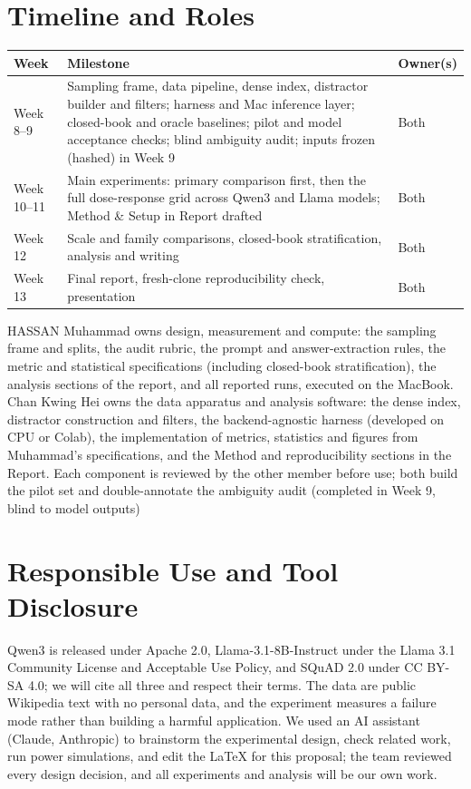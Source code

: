 \documentclass[11pt]{article}
\begin{document}
\section{Timeline and Roles}
\begin{tabularx}{\linewidth}{@{}l X l@{}}
\toprule
\textbf{Week} & \textbf{Milestone} & \textbf{Owner(s)} \\
\midrule
Week 8--9 & Sampling frame, data pipeline, dense index, distractor builder and filters; harness and Mac inference layer; closed-book and oracle baselines; pilot and model acceptance checks; blind ambiguity audit; inputs frozen (hashed) in Week 9 & Both \\
Week 10--11 & Main experiments: primary comparison first, then the full dose-response grid across Qwen3 and Llama models; Method \& Setup in Report drafted & Both \\
Week 12 & Scale and family comparisons, closed-book stratification, analysis and writing & Both \\
Week 13 & Final report, fresh-clone reproducibility check, presentation & Both \\
\bottomrule
\end{tabularx}

\vspace{0.4em}
HASSAN Muhammad owns design, measurement and compute: the sampling frame and splits, the audit rubric, the prompt and answer-extraction rules, the metric and statistical specifications (including closed-book stratification), the analysis sections of the report, and all reported runs, executed on the MacBook. Chan Kwing Hei owns the data apparatus and analysis software: the dense index, distractor construction and filters, the backend-agnostic harness (developed on CPU or Colab), the implementation of metrics, statistics and figures from Muhammad's specifications, and the Method and reproducibility sections in the Report. Each component is reviewed by the other member before use; both build the pilot set and double-annotate the ambiguity audit (completed in Week 9, blind to model outputs)

\section{Responsible Use and Tool Disclosure}
Qwen3 is released under Apache 2.0, Llama-3.1-8B-Instruct under the Llama 3.1 Community License and Acceptable Use Policy, and SQuAD 2.0 under CC BY-SA 4.0; we will cite all three and respect their terms. The data are public Wikipedia text with no personal data, and the experiment measures a failure mode rather than building a harmful application. We used an AI assistant (Claude, Anthropic) to brainstorm the experimental design, check related work, run power simulations, and edit the LaTeX for this proposal; the team reviewed every design decision, and all experiments and analysis will be our own work.
\end{document}
